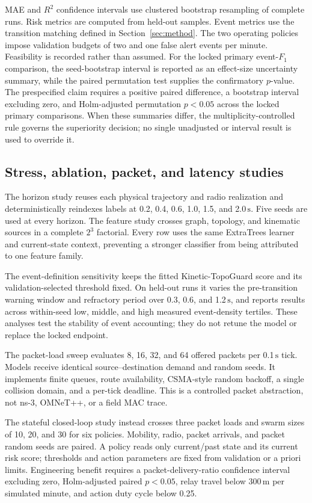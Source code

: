 \documentclass[final,5p,times,twocolumn]{elsarticle}
\newcommand{\SI}[2]{#1\,\ensuremath{\mathrm{#2}}}
\begin{document}
MAE and $R^2$ confidence intervals use clustered bootstrap resampling of complete runs.
Risk metrics are computed from held-out samples. Event metrics use the transition matching
defined in Section~\ref{sec:method}. The two operating policies impose validation budgets
of two and one false alert events per minute. Feasibility is recorded rather than assumed.
For the locked primary event-$F_1$ comparison, the seed-bootstrap interval is reported as
an effect-size uncertainty summary, while the paired permutation test supplies the
confirmatory $p$-value. The prespecified claim requires a positive paired difference, a
bootstrap interval excluding zero, and Holm-adjusted permutation $p<0.05$ across the locked
primary comparisons. When these summaries differ, the multiplicity-controlled rule governs
the superiority decision; no single unadjusted or interval result is used to override it.

\subsection{Stress, ablation, packet, and latency studies}

The horizon study reuses each physical trajectory and radio realization and deterministically
reindexes labels at 0.2, 0.4, 0.6, 1.0, 1.5, and \SI{2.0}{s}. Five seeds are used at every
horizon. The feature study crosses graph, topology, and kinematic sources in a complete
$2^3$ factorial. Every row uses the same ExtraTrees learner and current-state context,
preventing a stronger classifier from being attributed to one feature family.

The event-definition sensitivity keeps the fitted Kinetic-TopoGuard score and its
validation-selected threshold fixed. On held-out runs it varies the pre-transition warning
window and refractory period over 0.3, 0.6, and \SI{1.2}{s}, and reports results across
within-seed low, middle, and high measured event-density tertiles. These analyses test the
stability of event accounting; they do not retune the model or replace the locked endpoint.

The packet-load sweep evaluates 8, 16, 32, and 64 offered packets per \SI{0.1}{s} tick.
Models receive identical source--destination demand and random seeds. It implements finite
queues, route availability, CSMA-style random backoff, a single collision domain, and a
per-tick deadline. This is a controlled packet abstraction, not ns-3, OMNeT++, or a field
MAC trace.

The stateful closed-loop study instead crosses three packet loads and swarm sizes of 10,
20, and 30 for six policies. Mobility, radio, packet arrivals, and packet random seeds are
paired. A policy reads only current/past state and its current risk score; thresholds and
action parameters are fixed from validation or a priori limits. Engineering benefit
requires a packet-delivery-ratio confidence interval excluding zero, Holm-adjusted paired
$p<0.05$, relay travel below \SI{300}{m} per simulated minute, and action duty cycle below
0.25.
\end{document}
